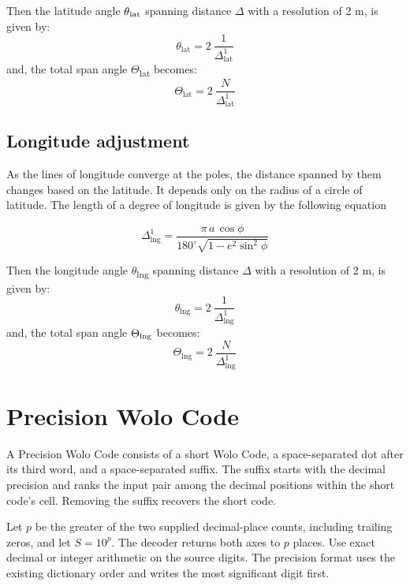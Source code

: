 \documentclass[conference]{IEEEtran}
\begin{document}
Then the latitude angle $\theta\textsubscript{lat}$ spanning distance $\Delta$ with a resolution of 2 m, is given by:
\begin{equation}
\theta_{\mathrm{lat}} = 2\ \frac{1}{\Delta_{\mathrm{lat}}^1}
\end{equation}
and, the total span angle $\Theta$\textsubscript{lat} becomes:
\begin{equation}
\Theta_{\mathrm{lat}} = 2\ \frac{N}{\Delta_{\mathrm{lat}}^1}
\end{equation}

\subsection{Longitude adjustment}
As the lines of longitude converge at the poles, the distance spanned by them changes based on the latitude. It depends only on the radius of a circle of latitude. The length of a degree of longitude is given by the following equation\cite{b3}

\begin{equation}
\Delta_{\mathrm{lng}}^1 = \frac{\pi\,a\,\cos\phi}{180^\circ \sqrt{1-e^2 \sin^2\phi}}
\end{equation}

Then the longitude angle $\theta$\textsubscript{lng} spanning distance $\Delta$ with a resolution of 2 m, is given by:
\begin{equation}
\theta_{\mathrm{lng}} = 2\ \frac{1}{\Delta_{\mathrm{lng}}^1}
\end{equation}
and, the total span angle $\Theta\textsubscript{lng}$ becomes:
\begin{equation}
\Theta_{\mathrm{lng}} = 2\ \frac{N}{\Delta_{\mathrm{lng}}^1}
\end{equation}

\section{Precision Wolo Code}

A Precision Wolo Code consists of a short Wolo Code, a space-separated dot after its third word, and a space-separated suffix. The suffix starts with the decimal precision and ranks the input pair among the decimal positions within the short code's cell. Removing the suffix recovers the short code.

Let $p$ be the greater of the two supplied decimal-place counts, including trailing zeros, and let $S=10^p$. The decoder returns both axes to $p$ places. Use exact decimal or integer arithmetic on the source digits. The precision format uses the existing dictionary order and writes the most significant digit first.
\end{document}
